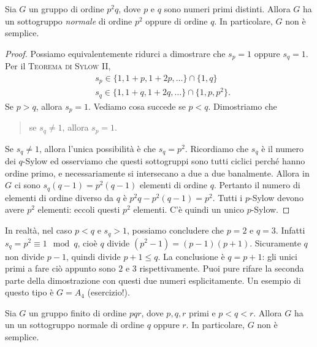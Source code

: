 \begin{prop}\label{prop:GruppiP2Q}
Sia $G$ un gruppo di ordine $p^2q$, dove $p$ e $q$ sono numeri primi distinti. Allora $G$ ha un sottogruppo {\em normale} di ordine $p^2$ oppure di ordine $q$. In particolare, $G$ non è semplice.%
\end{prop}

\begin{proof}
Possiamo equivalentemente ridurci a dimostrare che $s_p = 1$ oppure $s_q = 1$. Per il {\scshape Teorema di Sylow II}, 
\[\begin{aligned}
& s_p \in \{1, 1+p, 1+2p, \dots{}\} \cap \{1, q\} \\
& s_q \in \{1, 1+q, 1+2q, \dots{}\} \cap \{1, p, p^2\} .
\end{aligned}\]
Se $p > q$, allora $s_p = 1$. Vediamo cosa succede se $p < q$. Dimostriamo che
\begin{quotation}
se $s_q \ne 1$, allora $s_p = 1$.
\end{quotation}
Se $s_q \ne 1$, allora l'unica possibilità è che $s_q = p^2$. Ricordiamo che $s_q$ è il numero dei $q$-Sylow ed osserviamo che questi sottogruppi sono tutti ciclici perché hanno ordine primo, e necessariamente si intersecano a due a due banalmente. Allora in $G$ ci sono $s_q(q-1) = p^2(q-1)$ elementi di ordine $q$. Pertanto il numero di elementi di ordine diverso da $q$ è $p^2q - p^2(q-1) = p^2$. Tutti i $p$-Sylow devono avere $p^2$ elementi: eccoli questi $p^2$ elementi. C'è quindi un unico $p$-Sylow.
\end{proof}

\begin{osse}
In realtà, nel caso $p<q$ e $s_q>1$, possiamo concludere che $p=2$ e $q=3$. Infatti $s_q = p^2 \equiv 1 \mod q$, cioè $q$ divide $(p^2-1)=(p-1)(p+1)$. Sicuramente $q$ non divide $p-1$, quindi divide $p+1 \le q$. La conclusione è $q=p+1$: gli unici primi a fare ciò appunto sono $2$ e $3$ rispettivamente. Puoi pure rifare la seconda parte della dimostrazione con questi due numeri esplicitamente. Un esempio di questo tipo è $G=A_4$ (esercizio!).
\end{osse}


\begin{prop}\label{prop:GruppiPQR}
Sia $G$ un gruppo finito di ordine $pqr$, dove $p, q, r$ primi e $p < q < r$. Allora $G$ ha un un sottogruppo normale di ordine $q$ oppure $r$. In particolare, $G$ non è semplice.
\end{prop}

